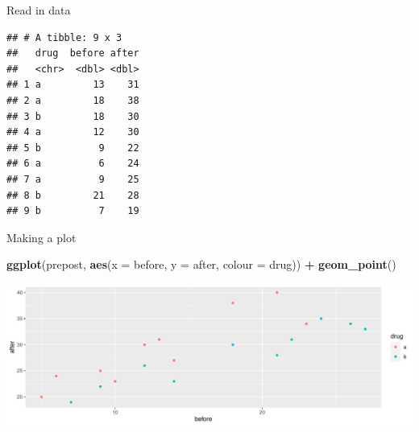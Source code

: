 \documentclass[
  ignorenonframetext,
]{beamer}
\newenvironment{Shaded}{\begin{snugshade}}{\end{snugshade}}
\newcommand{\CommentTok}[1]{\textcolor[rgb]{0.56,0.35,0.01}{\textit{#1}}}
\newcommand{\DataTypeTok}[1]{\textcolor[rgb]{0.13,0.29,0.53}{#1}}
\newcommand{\DecValTok}[1]{\textcolor[rgb]{0.00,0.00,0.81}{#1}}
\newcommand{\KeywordTok}[1]{\textcolor[rgb]{0.13,0.29,0.53}{\textbf{#1}}}
\newcommand{\NormalTok}[1]{#1}
\newcommand{\OperatorTok}[1]{\textcolor[rgb]{0.81,0.36,0.00}{\textbf{#1}}}
\newcommand{\StringTok}[1]{\textcolor[rgb]{0.31,0.60,0.02}{#1}}
\begin{document}
\begin{frame}[fragile]{Read in data}
\protect\hypertarget{read-in-data-2}{}

\begin{Shaded}
\end{Shaded}

\begin{verbatim}
## # A tibble: 9 x 3
##   drug  before after
##   <chr>  <dbl> <dbl>
## 1 a         13    31
## 2 a         18    38
## 3 b         18    30
## 4 a         12    30
## 5 b          9    22
## 6 a          6    24
## 7 a          9    25
## 8 b         21    28
## 9 b          7    19
\end{verbatim}

\end{frame}

\begin{frame}[fragile]{Making a plot}
\protect\hypertarget{making-a-plot-1}{}

\begin{Shaded}
\begin{Highlighting}[]
\KeywordTok{ggplot}\NormalTok{(prepost, }\KeywordTok{aes}\NormalTok{(}\DataTypeTok{x =}\NormalTok{ before, }\DataTypeTok{y =}\NormalTok{ after, }\DataTypeTok{colour =}\NormalTok{ drug)) }\OperatorTok{+}
\StringTok{  }\KeywordTok{geom_point}\NormalTok{()}
\end{Highlighting}
\end{Shaded}

\includegraphics{slides_d29_files/figure-beamer/ancova-plot-1.pdf}

\end{frame}
\end{document}
